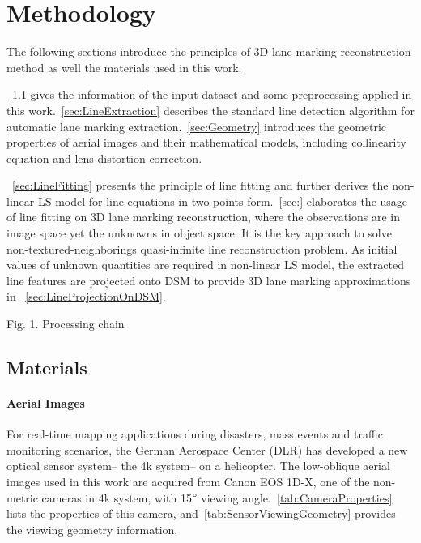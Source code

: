 
\chapter{Methodology}
\label{chap:k2}

The following sections introduce the principles of 3D lane marking reconstruction method as well the materials used in this work.%

~\cref{sec:Materials} gives the information of the input dataset and some preprocessing applied in this work.~\cref{sec:LineExtraction} describes the standard line detection algorithm for automatic lane marking extraction.~\cref{sec:Geometry} introduces the geometric properties of aerial images and their mathematical models, including collinearity equation and lens distortion correction.

~\cref{sec:LineFitting} presents the principle of line fitting and further derives the non-linear LS model for line equations in two-points form.~\cref{sec:} elaborates the usage of line fitting on 3D lane marking reconstruction, where the observations are in image space yet the unknowns in object space. It is the key approach to solve non-textured-neighborings quasi-infinite line reconstruction problem. As initial values of unknown quantities are required in non-linear LS model, the extracted line features are projected onto DSM to provide 3D lane marking approximations in ~\cref{sec:LineProjectionOnDSM}.

Fig. 1. Processing chain

\clearpage

\section{Materials}
\label{sec:Materials}


\subsubsection{Aerial Images}

For real-time mapping applications during disasters, mass events and traffic monitoring scenarios, the German Aerospace Center (DLR) has developed a new optical sensor system-- the 4k system-- on a helicopter. %
The low-oblique aerial images used in this work are acquired from Canon EOS 1D-X, one of the non-metric cameras in 4k system, with 15$\degree$ viewing angle.~\cref{tab:CameraProperties} lists the properties of this camera, and~\cref{tab:SensorViewingGeometry} provides the viewing geometry information.

